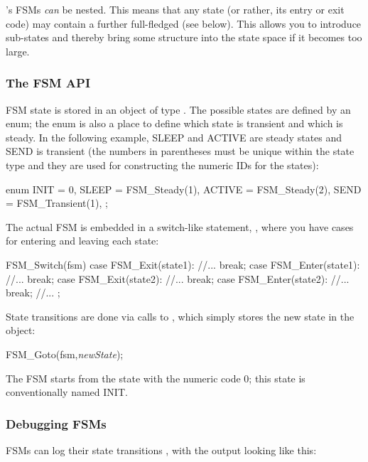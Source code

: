 {\opp}'s FSMs \textit{can} be nested. This means
that any state (or rather, its entry or exit code) may contain a
further full-fledged  (see below). This allows you
to introduce sub-states and thereby bring some structure into the
state space if it becomes too large.


\subsubsection{The FSM API}


FSM state is stored in an object of type . The possible states
are defined by an enum; the enum is also a place to define which
state is transient and which is steady. In the following example, SLEEP
and ACTIVE are steady states and SEND is transient (the numbers
in parentheses must be unique within the state type and they are used
for constructing the numeric IDs for the states):

\begin{cpp}
enum {
  INIT = 0,
  SLEEP = FSM_Steady(1),
  ACTIVE = FSM_Steady(2),
  SEND = FSM_Transient(1),
};
\end{cpp}



The actual FSM is embedded in a switch-like statement,
, where you have cases for entering and leaving
each state:


\begin{cpp}
FSM_Switch(fsm)
{
  case FSM_Exit(state1):
    //...
    break;
  case FSM_Enter(state1):
    //...
    break;
  case FSM_Exit(state2):
    //...
    break;
  case FSM_Enter(state2):
    //...
    break;
  //...
};
\end{cpp}


State transitions are done via calls to
, which simply stores the new state in the
 object:

\begin{cpp}
FSM_Goto(fsm,\textit{newState});
\end{cpp}

The FSM starts from the state with the numeric code 0; this state
is conventionally named INIT.


\subsubsection{Debugging FSMs}

FSMs can log their state transitions ,
with the output looking like this:

